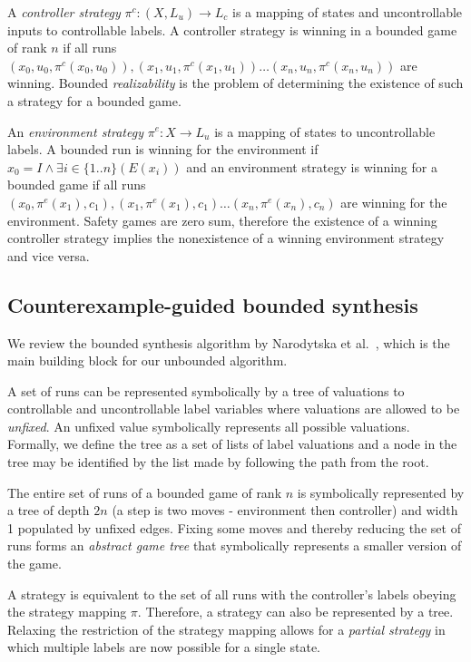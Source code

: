 \documentclass{llncs}
\begin{document}
A \emph{controller strategy} $\pi^c : (X, L_u) \to L_c$ is a mapping of states
and uncontrollable inputs to controllable labels. A controller strategy is
winning in a bounded game of rank $n$ if all runs $(x_0, u_0, \pi^c(x_0, u_0)),
(x_1, u_1, \pi^c(x_1, u_1)) \dots (x_n, u_n, \pi^c(x_n, u_n))$ are winning.
Bounded \emph{realizability} is the problem of determining the existence of
such a strategy for a bounded game.

An \emph{environment strategy} $\pi^e : X \to L_u$ is a mapping of states to
uncontrollable labels. A bounded run is winning for the environment if $x_0
= I \land \exists i \in \{1..n\} (E(x_i))$ and an environment strategy is
winning for a bounded game if all runs $(x_0, \pi^e(x_1), c_1), (x_1,
\pi^e(x_1), c_1) \dots (x_n, \pi^e(x_n), c_n)$ are winning for the environment.
Safety games are zero sum, therefore the existence of a winning controller strategy
implies the nonexistence of a winning environment strategy and vice versa.

\subsection{Counterexample-guided bounded synthesis}

We review the bounded synthesis algorithm by Narodytska et al.~\cite{narodytska2014},
which is the main building block for our unbounded algorithm.

A set of runs can be represented symbolically by a tree of valuations to
controllable and uncontrollable label variables where valuations are allowed to
be \emph{unfixed}. An unfixed value symbolically represents all possible
valuations. Formally, we define the tree as a set of lists of label valuations
and a node in the tree may be identified by the list made by following the path
from the root.

The entire set of runs of a bounded game of rank $n$ is symbolically
represented by a tree of depth $2n$ (a step is two moves - environment then
controller) and width 1 populated by unfixed edges.  Fixing some moves and
thereby reducing the set of runs forms an \emph{abstract game tree} that
symbolically represents a smaller version of the game.

A strategy is equivalent to the set of all runs with the controller's labels
obeying the strategy mapping $\pi$. Therefore, a strategy can also be
represented by a tree. Relaxing the restriction of the strategy mapping allows
for a \emph{partial strategy} in which multiple labels are now possible for a
single state.
\end{document}
